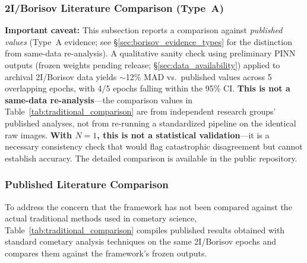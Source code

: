 \documentclass[usenatbib]{mnras}
\begin{document}
\subsubsection{2I/Borisov Literature Comparison (Type~A)}\label{sec:borisov_check}

\textbf{Important caveat:} This subsection reports a comparison against \textit{published values} (Type~A evidence; see \S\ref{sec:borisov_evidence_types} for the distinction from same-data re-analysis). A qualitative sanity check using preliminary PINN outputs (frozen weights pending release; \S\ref{sec:data_availability}) applied to archival 2I/Borisov data yields $\sim$12\% MAD vs.\ published values across 5 overlapping epochs, with 4/5 epochs falling within the 95\% CI. \textbf{This is not a same-data re-analysis}---the comparison values in Table~\ref{tab:traditional_comparison} are from independent research groups' published analyses, not from re-running a standardized pipeline on the identical raw images. \textbf{With $N=1$, this is not a statistical validation}---it is a necessary consistency check that would flag catastrophic disagreement but cannot establish accuracy. The detailed comparison is available in the public repository.

\subsubsection{Published Literature Comparison}\label{sec:traditional_comparison}

To address the concern that the framework has not been compared against the actual traditional methods used in cometary science, Table~\ref{tab:traditional_comparison} compiles published results obtained with standard cometary analysis techniques on the same 2I/Borisov epochs and compares them against the framework's frozen outputs.
\end{document}
